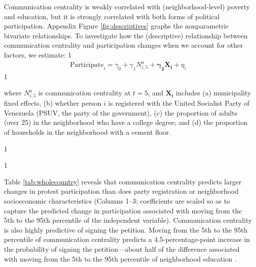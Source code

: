 \documentclass[12pt]{article}
\newcommand{\StepCountInText}{5} %
\newcommand{\jop}{0} %
\begin{document}
Communication centrality is weakly correlated with (neighborhood-level) poverty and education, but it is strongly correlated with both forms of political participation. Appendix Figure \ref{fig:descriptives} graphs the nonparametric bivariate relationships. To investigate how the (descriptive) relationship between communication centrality and participation changes when we account for other factors, we estimate:
\if\jop1
\vspace{-.5cm}
\fi
\begin{align}\label{eq:fullpopulation}
\text{Participate}_i = \gamma_0 + \gamma_1 N_{i,\StepCountInText}^a + \boldsymbol{\gamma_2} \boldsymbol{X_i} +  \eta_i
\end{align}
\if\jop1
\vspace{-1.5cm}
\fi

\noindent where $N_{i,\StepCountInText}^a$ is communication centrality at $t=5$, and $\boldsymbol{X_i}$ includes (a) municipality fixed effects, (b) whether person $i$ is registered with the United Socialist Party of Venezuela (PSUV, the party of the government), (c) the proportion of adults (over 25) in the neighborhood who have a college degree; and (d) the proportion of households in the neighborhood with a cement floor.


\if\jop1
\linespread{1.1}\selectfont
\fi

\if\jop1
\linespread{2}\selectfont
\fi



Table \ref{tab:wholecountry} reveals that communication centrality predicts larger changes in protest participation than does party registration or neighborhood socioeconomic characteristics (Columns 1--3; coefficients are scaled so as to capture the predicted change in participation associated with moving from the 5th to the 95th percentile of the independent variable). Communication centrality is also highly predictive of signing the petition. Moving from the 5th to the 95th percentile of communication centrality predicts a 4.5-percentage-point increase in the probability of signing the petition---about half of the difference associated with moving from the 5th to the 95th percentile of neighborhood education \citep[c.f.][]{boothseligson2006}.



\end{document}
